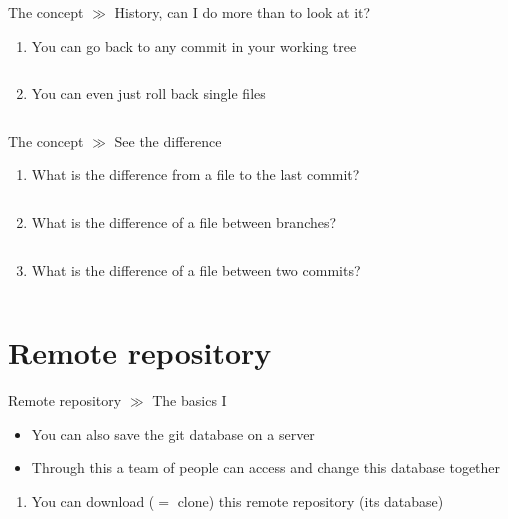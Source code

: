 \documentclass[10pt]{beamer}
\begin{document}
\begin{frame}{The concept $\gg$ History, can I do more than to look at it?}
	\begin{enumerate}
		\item You can go back to any commit in your working tree
		\inputminted[bgcolor=lightGreyCustom,fontsize=\scriptsize]{sh}{./resources/git_checkout_01_repo.sh}
		\item You can even just roll back single files
		\inputminted[bgcolor=lightGreyCustom,fontsize=\scriptsize]{sh}{./resources/git_checkout_02_single_file.sh}
	\end{enumerate}
\end{frame}

\begin{frame}{The concept $\gg$ See the difference}
\begin{enumerate}
	\item What is the difference from a file to the last commit?
	\inputminted[bgcolor=lightGreyCustom,fontsize=\scriptsize]{sh}{./resources/git_diff_01_file.sh}
	\item What is the difference of a file between branches?
	\inputminted[bgcolor=lightGreyCustom,fontsize=\scriptsize]{sh}{./resources/git_diff_02_file_branches.sh}
	\item What is the difference of a file between two commits?
	\inputminted[bgcolor=lightGreyCustom,fontsize=\scriptsize]{sh}{./resources/git_diff_03_file_commits.sh}
\end{enumerate}
\end{frame}

\section{Remote repository}

\begin{frame}{Remote repository $\gg$ The basics I}
	\begin{itemize}
		\item You can also save the git database on a server
		\item Through this a team of people can access and change this database together
	\end{itemize}
	\begin{enumerate}
		\item You can download ($=$ clone) this remote repository (its database)
		\inputminted[bgcolor=lightGreyCustom,fontsize=\scriptsize]{sh}{./resources/git_remote_repository_01_clone.sh}
	\end{enumerate}
\end{frame}
\end{document}
